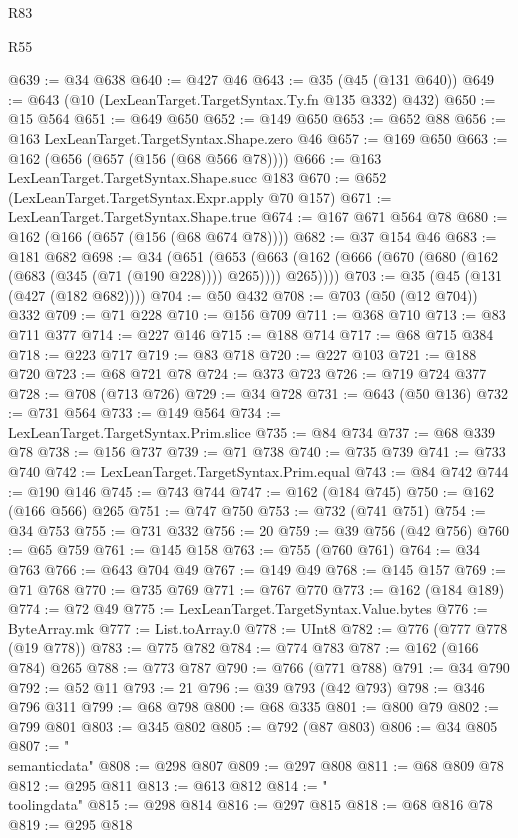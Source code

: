 \begin{lexlean}{R83}
\begin{lexlean}{R55}
\begin{coremodule}
{{{{{{{{{{{{{{{{{{{{{{{{{{{{{{{{{{{{{{{{{{{{{{{{{{{{{{{{{{{{{{@639 := @34 @638
@640 := @427 @46
@643 := @35 (@45 (@131 @640))
@649 := @643 (@10 (LexLeanTarget.TargetSyntax.Ty.fn @135 @332) @432)
@650 := @15 @564
@651 := @649 @650
@652 := @149 @650
@653 := @652 @88
@656 := @163 LexLeanTarget.TargetSyntax.Shape.zero @46
@657 := @169 @650
@663 := @162 (@656 (@657 (@156 (@68 @566 @78))))
@666 := @163 LexLeanTarget.TargetSyntax.Shape.succ @183
@670 := @652 (LexLeanTarget.TargetSyntax.Expr.apply @70 @157)
@671 := LexLeanTarget.TargetSyntax.Shape.true
@674 := @167 @671 @564 @78
@680 := @162 (@166 (@657 (@156 (@68 @674 @78))))
@682 := @37 @154 @46
@683 := @181 @682
@698 := @34
    (@651
      (@653 (@663 (@162 (@666 (@670 (@680 (@162 (@683 (@345 (@71 (@190 @228)))) @265)))) @265))))
@703 := @35 (@45 (@131 (@427 (@182 @682))))
@704 := @50 @432
@708 := @703 (@50 (@12 @704)) @332
@709 := @71 @228
@710 := @156 @709
@711 := @368 @710
@713 := @83 @711 @377
@714 := @227 @146
@715 := @188 @714
@717 := @68 @715 @384
@718 := @223 @717
@719 := @83 @718
@720 := @227 @103
@721 := @188 @720
@723 := @68 @721 @78
@724 := @373 @723
@726 := @719 @724 @377
@728 := @708 (@713 @726)
@729 := @34 @728
@731 := @643 (@50 @136)
@732 := @731 @564
@733 := @149 @564
@734 := LexLeanTarget.TargetSyntax.Prim.slice
@735 := @84 @734
@737 := @68 @339 @78
@738 := @156 @737
@739 := @71 @738
@740 := @735 @739
@741 := @733 @740
@742 := LexLeanTarget.TargetSyntax.Prim.equal
@743 := @84 @742
@744 := @190 @146
@745 := @743 @744
@747 := @162 (@184 @745)
@750 := @162 (@166 @566) @265
@751 := @747 @750
@753 := @732 (@741 @751)
@754 := @34 @753
@755 := @731 @332
@756 := 20
@759 := @39 @756 (@42 @756)
@760 := @65 @759
@761 := @145 @158
@763 := @755 (@760 @761)
@764 := @34 @763
@766 := @643 @704 @49
@767 := @149 @49
@768 := @145 @157
@769 := @71 @768
@770 := @735 @769
@771 := @767 @770
@773 := @162 (@184 @189)
@774 := @72 @49
@775 := LexLeanTarget.TargetSyntax.Value.bytes
@776 := ByteArray.mk
@777 := List.toArray.{0}
@778 := UInt8
@782 := @776 (@777 @778 (@19 @778))
@783 := @775 @782
@784 := @774 @783
@787 := @162 (@166 @784) @265
@788 := @773 @787
@790 := @766 (@771 @788)
@791 := @34 @790
@792 := @52 @11
@793 := 21
@796 := @39 @793 (@42 @793)
@798 := @346 @796 @311
@799 := @68 @798
@800 := @68 @335
@801 := @800 @79
@802 := @799 @801
@803 := @345 @802
@805 := @792 (@87 @803)
@806 := @34 @805
@807 := "\\semanticdata"
@808 := @298 @807
@809 := @297 @808
@811 := @68 @809 @78
@812 := @295 @811
@813 := @613 @812
@814 := "\\toolingdata"
@815 := @298 @814
@816 := @297 @815
@818 := @68 @816 @78
@819 := @295 @818
}}}}}}}}}}}}}}}}}}}}}}}}}}}}}}}}}}}}}}}}}}}}}}}}}}}}}}}}}}}}}}
\end{coremodule}
\end{lexlean}
\end{lexlean}
